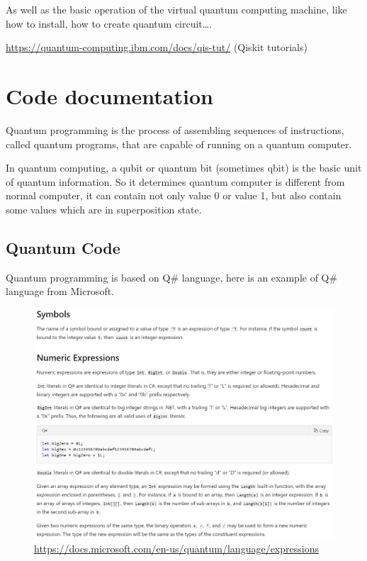 \documentclass{article}
\begin{document}
As well as the basic operation of the virtual quantum computing machine, like how to install, how to create quantum circuit….

\url{https://quantum-computing.ibm.com/docs/qis-tut/} (Qiskit tutorials)
\newpage


\section{Code documentation}
Quantum programming is the process of assembling sequences of instructions, called quantum programs, that are capable of running on a quantum computer. 

In quantum computing, a qubit or quantum bit (sometimes qbit) is the basic unit of quantum information. So it determines quantum computer is different from normal computer, it can contain not only value 0 or value 1, but also contain some values which are in superposition state.

\subsection{Quantum Code}
Quantum programming is based on Q\# language, here is an example of Q# language from Microsoft.

\begin{figure}[htbp]
\centerline{\includegraphics[width=\textwidth]{2.png}}
\caption{\url{https://docs.microsoft.com/en-us/quantum/language/expressions}}
\label{fig}
\end{figure}
\newpage
\end{document}
